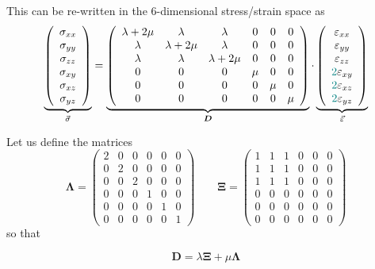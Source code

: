 
This can be re-written in the 6-dimensional stress/strain space as
\begin{equation}
\underbrace{
\left(
\begin{array}{c}
\sigma_{xx} \\
\sigma_{yy} \\
\sigma_{zz} \\
\sigma_{xy} \\
\sigma_{xz} \\
\sigma_{yz} 
\end{array}
\right)}
_{\vec{\sigma}}
=
\underbrace{
\left(
\begin{array}{cccccc}
\lambda+2\mu & \lambda & \lambda & 0 & 0 & 0 \\ 
\lambda & \lambda+2\mu & \lambda & 0 & 0 & 0 \\ 
\lambda & \lambda & \lambda+2\mu & 0 & 0 & 0 \\
0 & 0 & 0 & \mu & 0 & 0 \\ 
0 & 0 & 0 & 0 & \mu & 0 \\ 
0 & 0 & 0 & 0 & 0 & \mu  
\end{array}
\right)}
_{{\bm D}}
\cdot
\underbrace{
\left(
\begin{array}{c}
\varepsilon_{xx} \\
\varepsilon_{yy} \\
\varepsilon_{zz} \\
{\color{teal}2}\varepsilon_{xy} \\
{\color{teal}2}\varepsilon_{xz} \\
{\color{teal}2}\varepsilon_{yz} 
\end{array}
\right)}
_{\vec{\varepsilon}}
\label{eq:el:vectors}
\end{equation}

Let us define the matrices
\[
{\bm \Lambda}=
\left(
\begin{array}{cccccc}
2 & 0 & 0 & 0 & 0 & 0 \\
0 & 2 & 0 & 0 & 0 & 0 \\
0 & 0 & 2 & 0 & 0 & 0 \\
0 & 0 & 0 & 1 & 0 & 0 \\
0 & 0 & 0 & 0 & 1 & 0 \\
0 & 0 & 0 & 0 & 0 & 1 
\end{array}
\right)
\qquad
{\bm \Xi}=
\left(
\begin{array}{cccccc}
1 & 1 & 1 & 0 & 0 & 0\\ 
1 & 1 & 1 & 0 & 0 & 0\\ 
1 & 1 & 1 & 0 & 0 & 0\\ 
0 & 0 & 0 & 0 & 0 & 0 \\
0 & 0 & 0 & 0 & 0 & 0 \\
0 & 0 & 0 & 0 & 0 & 0 
\end{array}
\right)
\]
so that 
\begin{mdframed}[backgroundcolor=blue!5]
\[
{\bm D} = \lambda {\bm \Xi} + \mu {\bm \Lambda} 
\]
\end{mdframed}

